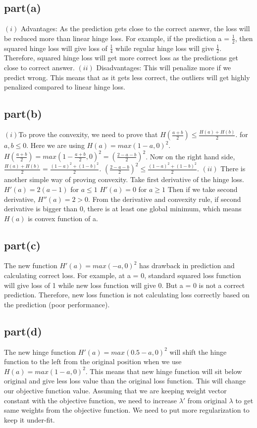 \documentclass{article}
\begin{document}
\subsection{part(a)}
$(i)$ Advantages: As the prediction gets close to the correct answer, the loss will be reduced more than linear hinge loss. For example, if the prediction a = $\frac{1}{2}$, then squared hinge loss will give loss of $\frac{1}{4}$ while regular hinge loss will give $\frac{1}{2}$. Therefore, squared hinge loss will get more correct loss as the predictions get close to correct answer.
\newline
$(ii)$ Disadvantages: This will penalize more if we predict wrong. This means that as it gets less correct, the outliers will get highly penalized compared to linear hinge loss.
\subsection{part(b)}
$(i)$To prove the convexity, we need to prove that $H(\frac{a+b}{2}) \leqslant \frac{H(a)+H(b)}{2}$. for $a, b \leqslant 0$. Here we are using $H(a) = max(1 - a, 0)^2$. $H(\frac{a+b}{2}) = max(1 - \frac{a+b}{2}, 0)^2 = (\frac{2-a-b}{2})^2$. Now on the right hand side, $\frac{H(a)+H(b)}{2} = \frac{(1-a)^2+(1-b)^2}{2}$.  \newline$(\frac{2-a-b}{2})^2\leqslant \frac{(1-a)^2+(1-b)^2}{2}$.
\newline $(ii)$ There is another simple way of proving convexity. Take first derivative of the hinge loss. \newline $H'(a) = 2(a-1)$ for $a \leqslant 1$ \newline $H'(a) = 0$ for $a \geqslant 1$ \newline Then if we take second derivative, $H''(a) = 2 > 0$. From the derivative and convexity rule, if second derivative is bigger than 0, there is at least one global minimum, which means $H(a)$ is convex function of a.
\subsection{part(c)}
The new function $H'(a) = max(-a,0)^2$ has drawback in prediction and calculating correct loss. For example, at a = 0, standard squared loss function will give loss of 1 while new loss function will give 0. But a = 0 is not a correct prediction. Therefore, new loss function is not calculating loss correctly based on the prediction (poor performance).
\subsection{part(d)}
The new hinge function $H'(a) = max(0.5 -a , 0)^2$ will shift the hinge function to the left from the original position when we use $H(a) = max(1-a, 0)^2$. This means that new hinge function will sit below original and give less loss value than the original loss function. This will change our objective function value. Assuming that we are keeping weight vector constant with the objective function, we need to increase $\lambda '$ from original $\lambda$ to get same weights from the objective function. We need to put more regularization to keep it under-fit. 
\newpage
\end{document}
